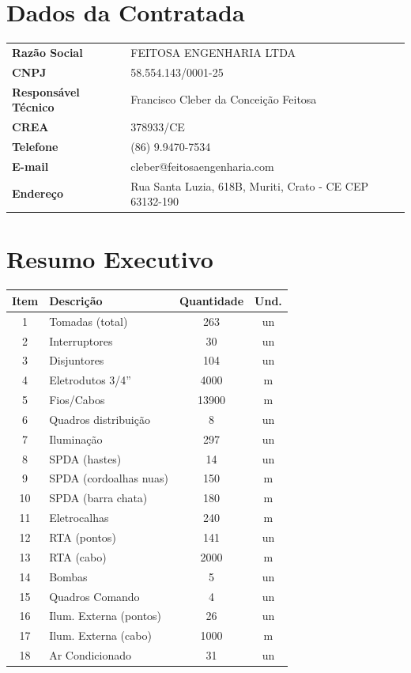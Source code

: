 \documentclass[12pt,a4paper]{article}
\renewenvironment{table}%
{\begin{center}%
\scriptsize%
\addtolength{\tabcolsep}{-2pt}%
}%
{\end{center}}
\begin{document}
\section{Dados da Contratada}

\begin{table}
\centering
\begin{tabular}{lp{10cm}}
\toprule
\textbf{Razão Social} & FEITOSA ENGENHARIA LTDA \\
\textbf{CNPJ} & 58.554.143/0001-25 \\
\textbf{Responsável Técnico} & Francisco Cleber da Conceição Feitosa \\
\textbf{CREA} & 378933/CE \\
\textbf{Telefone} & (86) 9.9470-7534 \\
\textbf{E-mail} & cleber@feitosaengenharia.com \\
\textbf{Endereço} & Rua Santa Luzia, 618B, Muriti, Crato - CE CEP 63132-190 \\
\bottomrule
\end{tabular}
\end{table}

\vspace{1cm}

\section{Resumo Executivo}

\begin{table}
\centering
\begin{tabular}{clcc}
\toprule
\textbf{Item} & \textbf{Descrição} & \textbf{Quantidade} & \textbf{Und.} \\
\midrule
1 & Tomadas (total) & 263 & un \\
2 & Interruptores & 30 & un \\
3 & Disjuntores & 104 & un \\
4 & Eletrodutos 3/4'' & 4000 & m \\
5 & Fios/Cabos & 13900 & m \\
6 & Quadros distribuição & 8 & un \\
7 & Iluminação & 297 & un \\
8 & SPDA (hastes) & 14 & un \\
9 & SPDA (cordoalhas nuas) & 150 & m \\
10 & SPDA (barra chata) & 180 & m \\
11 & Eletrocalhas & 240 & m \\
12 & RTA (pontos) & 141 & un \\
13 & RTA (cabo) & 2000 & m \\
14 & Bombas & 5 & un \\
15 & Quadros Comando & 4 & un \\
16 & Ilum. Externa (pontos) & 26 & un \\
17 & Ilum. Externa (cabo) & 1000 & m \\
18 & Ar Condicionado & 31 & un \\
\bottomrule
\end{tabular}
\end{table}
\end{document}
